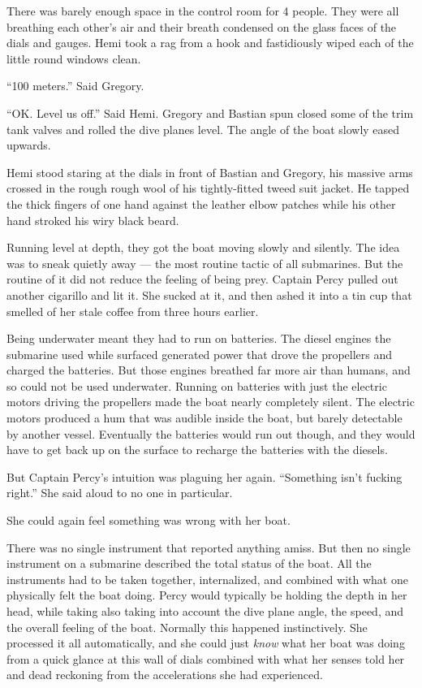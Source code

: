 \documentclass[]{scrbook}
\begin{document}
There was barely enough space in the control room for 4 people. They
were all breathing each other's air and their breath condensed on the
glass faces of the dials and gauges. Hemi took a rag from a hook and
fastidiously wiped each of the little round windows clean.

``100 meters.'' Said Gregory.

``OK. Level us off.'' Said Hemi. Gregory and Bastian spun closed some of
the trim tank valves and rolled the dive planes level. The angle of the
boat slowly eased upwards.

Hemi stood staring at the dials in front of Bastian and Gregory, his
massive arms crossed in the rough rough wool of his tightly-fitted tweed
suit jacket. He tapped the thick fingers of one hand against the leather
elbow patches while his other hand stroked his wiry black beard.

Running level at depth, they got the boat moving slowly and silently.
The idea was to sneak quietly away --- the most routine tactic of all
submarines. But the routine of it did not reduce the feeling of being
prey. Captain Percy pulled out another cigarillo and lit it. She sucked
at it, and then ashed it into a tin cup that smelled of her stale coffee
from three hours earlier.

Being underwater meant they had to run on batteries. The diesel engines
the submarine used while surfaced generated power that drove the
propellers and charged the batteries. But those engines breathed far
more air than humans, and so could not be used underwater. Running on
batteries with just the electric motors driving the propellers made the
boat nearly completely silent. The electric motors produced a hum that
was audible inside the boat, but barely detectable by another vessel.
Eventually the batteries would run out though, and they would have to
get back up on the surface to recharge the batteries with the diesels.

But Captain Percy's intuition was plaguing her again. ``Something isn't
fucking right.'' She said aloud to no one in particular.

She could again feel something was wrong with her boat.

There was no single instrument that reported anything amiss. But then no
single instrument on a submarine described the total status of the boat.
All the instruments had to be taken together, internalized, and combined
with what one physically felt the boat doing. Percy would typically be
holding the depth in her head, while taking also taking into account the
dive plane angle, the speed, and the overall feeling of the boat.
Normally this happened instinctively. She processed it all
automatically, and she could just \emph{know} what her boat was doing
from a quick glance at this wall of dials combined with what her senses
told her and dead reckoning from the accelerations she had experienced.
\end{document}
